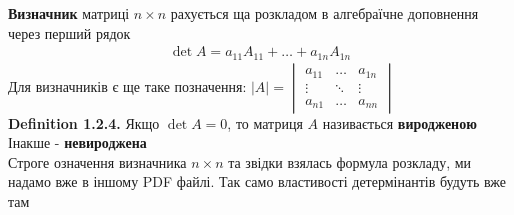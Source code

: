 \documentclass[a4paper, 10pt]{article}
\def\defin#1{\textbf{Definition {#1}}}
\theoremstyle{theoremdd}
\theoremstyle{theoremdd}
\theoremstyle{theoremdd}
\theoremstyle{theoremdd}
\theoremstyle{theoremdd}
\theoremstyle{theoremdd}
\theoremstyle{theoremdd}
\theoremstyle{theoremdd}
\begin{document}
	\textbf{Визначник} матриці $n \times n$ рахується ща розкладом в алгебраїчне доповнення через перший рядок
	\begin{align*}
	\det A = a_{11} A_{11} + \dots + a_{1n} A_{1n}
	\end{align*}
	Для визначників є ще таке позначення: $|A| = \begin{vmatrix}
	a_{11} & \dots & a_{1n} \\
	\vdots & \ddots & \vdots \\
	a_{n1} & \dots & a_{nn}
	\end{vmatrix}$
	\bigskip \\
	\defin{1.2.4.} Якщо $\det A = 0$, то матриця $A$ називається \textbf{виродженою} \\ Інакше - \textbf{невироджена}
	\bigskip \\
	Строге означення визначника $n \times n$ та звідки взялась формула розкладу, ми надамо вже в іншому PDF файлі. Так само властивості детермінантів будуть вже там
	\bigskip \\
\end{document}

